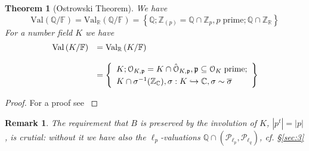 \documentclass[leqno]{article}
\newcommand{\pid}{\mathfrak{p}}
\newcommand{\bigo}{\mathcal{O} }
\newcommand{\F}{\mathbb{F}}
\newcommand{\Q}{\mathbb{Q}}
\newcommand{\R}{\mathbb{R}}
\newcommand{\C}{\mathbb{C}}
\newcommand{\Z}{\mathbb{Z}}
\newcommand{\biop}{\mathscr{P}}
\newtheorem{theorem}{Theorem}
\newtheorem{remark}[equation]{Remark}
\numberwithin{equation}{section}
\begin{document}
\begin{theorem}[Ostrowski Theorem]
				We have 
				\begin{equation}
								\text{Val}\left( \Q/\F \right) = \text{Val}_{\R}\left( \Q/\F \right)=
								\left\{ \Q;\Z_{(p)}=\Q\cap \Z_p,p\;\text{prime}; \Q\cap \Z_{\R} \right\}
								\label{eq:9.8}
				\end{equation}
				For a number field $K$ we have 
				\begin{equation}
								\begin{array}[H]{ll}
												\text{Val}\left( K/\F \right)&=\text{Val}_{\R}\left( K/\F \right) \\\\
								&= 
								
								\left\{
												\begin{array}[H]{l}
												K;\bigo_{K,\pid}=K\cap\hat{\bigo}_{K,\pid}, \pid \subseteq
												\bigo_{K}\;\text{prime}; \vspace{.1cm}\\
				K\cap\sigma^{-1}(\Z_{\C}),\sigma:K\hookrightarrow\C,\sigma\sim\overline{\sigma} 
												\end{array}\right\}
								\end{array}
				\label{eq:9.9}
				\end{equation}
				\label{thm:ostrowski}
\end{theorem}
\begin{proof}
  For a proof see \cite{H17}
\end{proof}
\begin{remark}
				The requirement that $B$ is preserved by the involution of $K$, $|p^{t}|=|p|$, is
				crutial: without it we have also the $\ell_p$-valuations $\Q\cap\left(
								\biop_{\ell_{p}},\biop_{\ell_{q}}
				\right)$, cf. \S\ref{sec:3}
				\label{remark:9.10}
\end{remark}
\end{document}
